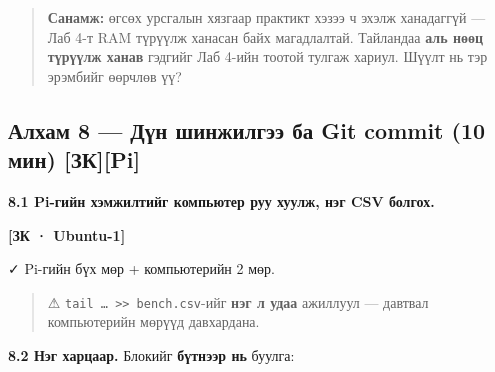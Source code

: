 \begin{quote}
\textbf{Санамж:} өгсөх урсгалын хязгаар практикт хэзээ ч эхэлж ханадаггүй --- Лаб 4-т RAM түрүүлж ханасан байх магадлалтай. Тайландаа \textbf{аль нөөц түрүүлж ханав} гэдгийг Лаб 4-ийн тоотой тулгаж хариул. Шүүлт нь тэр эрэмбийг өөрчлөв үү?
\end{quote}

\hypertarget{ux430ux43bux445ux430ux43c-8-ux434ux4afux43d-ux448ux438ux43dux436ux438ux43bux433ux44dux44d-ux431ux430-git-commit-10-ux43cux438ux43d-ux437ux43api}{%
\subsection{Алхам 8 --- Дүн шинжилгээ ба Git commit (10 мин) {[}ЗК{]}{[}Pi{]}}\label{ux430ux43bux445ux430ux43c-8-ux434ux4afux43d-ux448ux438ux43dux436ux438ux43bux433ux44dux44d-ux431ux430-git-commit-10-ux43cux438ux43d-ux437ux43api}}

\textbf{8.1 Pi-гийн хэмжилтийг компьютер руу хуулж, нэг CSV болгох.}

\textbf{{[}ЗК · Ubuntu-1{]}}

\begin{Shaded}
\begin{Highlighting}[]
\OperatorTok{\textgreater{}\textgreater{}}
\end{Highlighting}
\end{Shaded}

✓ Pi-гийн бүх мөр + компьютерийн 2 мөр.

\begin{quote}
⚠ \texttt{tail\ \ldots{}\ \textgreater{}\textgreater{}\ bench.\allowbreak{}csv}-ийг \textbf{нэг л удаа} ажиллуул --- давтвал компьютерийн мөрүүд давхардана.
\end{quote}

\textbf{8.2 Нэг харцаар.} Блокийг \textbf{бүтнээр нь} буулга:

